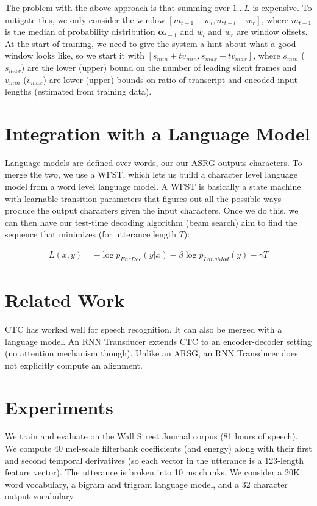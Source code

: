 \documentclass[a4paper]{article}
\begin{document}
The problem with the above approach is that summing over $1...L$ is expensive.
To mitigate this, we only consider the window $[m_{t-1} - w_l, m_{t-l} + w_r]$,
where $m_{t-1}$ is the median of probability distribution
$\mathbf{\alpha}_{t-1}$ and $w_l$ and $w_r$ are window offsets. At the start
of training, we need to give the system a hint about what a good window
looks like, so we start it with $[s_{min} + t v_{min}, s_{max} + t v_{max}]$,
where $s_{min}$ ($s_{max}$) are the lower (upper) bound on the number of
leading silent frames and $v_{min}$ ($v_{max}$) are lower (upper) bounds on
ratio of transcript and encoded input lengths (estimated from training data).

\section{Integration with a Language Model}
Language models are defined over words, our our ASRG outputs characters. To
merge the two, we use a WFST, which lets us build a character level
language model from a word level language model. A WFST is basically a
state machine with learnable transition parameters that figures out all
the possible ways produce the output characters given the input characters.
Once we do this, we can then have our test-time decoding algorithm (beam
search) aim to find the sequence that minimizes (for utterance length $T$):

\begin{align}
  L(x, y) = -\log p_{EncDec}(y | x) - \beta \log p_{LangMod}(y) - \gamma T
\end{align}

\section{Related Work}
CTC has worked well for speech recognition. It can also be merged with a
language model. An RNN Transducer extends CTC to an encoder-decoder setting
(no attention mechanism though). Unlike an ARSG, an RNN Transducer does not
explicitly compute an alignment.

\section{Experiments}
We train and evaluate on the Wall Street Journal corpus (81 hours of speech).
We compute 40 mel-scale filterbank coefficients (and energy) along with
their first and second temporal derivatives (so each vector in the utterance
is a 123-length feature vector). The utterance is broken into 10 ms chunks.
We consider a 20K word vocabulary, a bigram and trigram language model, and a
32 character output vocabulary.
\end{document}
